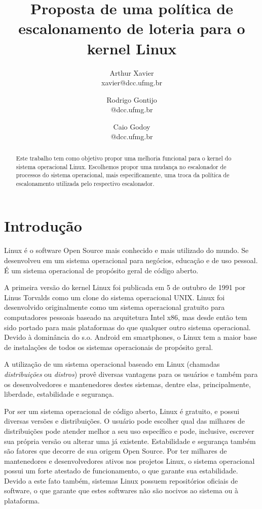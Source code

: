 \documentclass[a4paper,12pt]{article}
\title{Proposta de uma política de escalonamento de loteria para o kernel Linux}
\author{
    Arthur Xavier\\
    \small{xavier@dcc.ufmg.br}
    \and
    Rodrigo Gontijo\\
    \small{@dcc.ufmg.br}
    \and
    Caio Godoy\\
    \small{@dcc.ufmg.br}
}
\begin{document}
\maketitle

\begin{abstract}
  Este trabalho tem como objetivo propor uma melhoria funcional para o kernel do sistema operacional Linux. Escolhemos propor uma mudança no escalonador de processos do sistema operacional, mais especificamente, uma troca da política de escalonamento utilizada pelo respectivo escalonador.
\end{abstract}

\section{Introdução}
Linux é o software Open Source mais conhecido e mais utilizado do mundo. Se desenvolveu em um sistema operacional para negócios, educação e de uso pessoal. É um sistema operacional de propósito geral de código aberto. \cite{Welsh1998}

A primeira versão do kernel Linux foi publicada em 5 de outubro de 1991 por Linus Torvalds como um clone do sistema operacional UNIX. Linux foi desenvolvido originalmente como um sistema operacional gratuito para computadores pessoais baseado na arquitetura Intel x86, mas desde então tem sido portado para mais plataformas do que qualquer outro sistema operacional. Devido à dominância do s.o. Android em smartphones, o Linux tem a maior base de instalações de todos os sistemas operacionais de propósito geral. \cite{LinuxWikipedia2016}

A utilização de um sistema operacional baseado em Linux (chamadas \emph{distribuições} ou \emph{distros}) provê diversas vantagens para os usuários e também para os desenvolvedores e mantenedores destes sistemas, dentre elas, principalmente, liberdade, estabilidade e segurança.

Por ser um sistema operacional de código aberto, Linux é gratuito, e possui diversas versões e distribuições. O usuário pode escolher qual das milhares de distribuições pode atender melhor a seu uso específico e pode, inclusive, escrever sua própria versão ou alterar uma já existente. Estabilidade e segurança também são fatores que decorre de sua origem Open Source. Por ter milhares de mantenedores e desenvolvedores ativos nos projetos Linux, o sistema operacional possui um forte atestado de funcionamento, o que garante sua estabilidade. Devido a este fato também, sistemas Linux possuem repositórios oficiais de software, o que garante que estes softwares não são nocivos ao sistema ou à plataforma.
\end{document}
